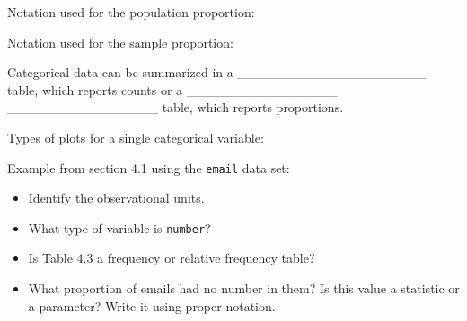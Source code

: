 \documentclass[
]{report}
\providecommand{\tightlist}{%
  \setlength{\itemsep}{0pt}\setlength{\parskip}{0pt}}
\begin{document}
Notation used for the population proportion:

\vspace{0.2in}

Notation used for the sample proportion:

\vspace{0.2in}


Categorical data can be summarized in a \_\_\_\_\_\_\_\_\_\_\_\_\_\_\_\_\_\_\_\_ table, which reports counts or a \_\_\_\_\_\_\_\_\_\_\_\_\_\_\_\_ \_\_\_\_\_\_\_\_\_\_\_\_\_\_\_\_ table, which reports proportions.


Types of plots for a single categorical variable:

\vspace{0.4in}

\vspace{2mm}

Example from section 4.1 using the \texttt{email} data set:

\begin{itemize}
\tightlist
\item
  Identify the observational units.
\end{itemize}

\vspace{0.2in}

\begin{itemize}
\tightlist
\item
  What type of variable is \texttt{number}?
\end{itemize}

\vspace{0.2in}

\begin{itemize}
\tightlist
\item
  Is Table 4.3 a frequency or relative frequency table?
\end{itemize}

\vspace{0.2in}

\begin{itemize}
\tightlist
\item
  What proportion of emails had no number in them? Is this value a statistic or a parameter? Write it using proper notation.
\end{itemize}

\vspace{0.3in}

\end{document}
